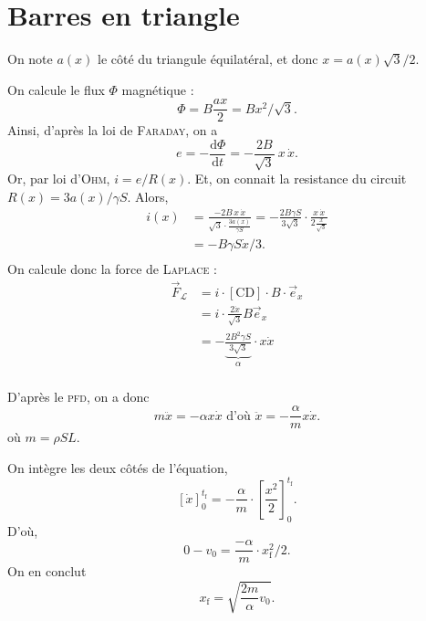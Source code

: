 \section{Barres en triangle}


On note $a(x)$ le côté du triangule équilatéral, et donc $x = a(x) \sqrt{3}  / 2$.

On calcule le flux $\Phi$ magnétique : \[
	\Phi = B \frac{a x}{2} = B x^2 / \sqrt{3}
.\]
Ainsi, d'après la loi de \textsc{Faraday}, on a \[
	e = - \frac{\mathrm{d}\Phi}{\mathrm{d}t} = - \frac{2B}{\sqrt{3}}  \: x\,\dot{x}
.\]
Or, par loi d'\textsc{Ohm}, $i = e / R(x)$.
Et, on connait la resistance du circuit $R(x) = 3 a(x) / \gamma S$.
Alors, 
\begin{align*}
	i(x) &= \frac{-2B\,x\,\dot{x}}{\sqrt{3} \cdot \frac{3a(x)}{\gamma S}} = - \frac{2B \gamma S}{3 \sqrt{3}} \cdot \frac{x\,\dot{x}}{2 \frac{x}{\sqrt{3}}}\\
	&= - B \gamma S \dot{x} / 3. \\
\end{align*}
On calcule donc la force de \textsc{Laplace} :
\begin{align*}
	\vec{F}_{\mathcal{L}} &= i \cdot [\mathrm{CD}] \cdot B \cdot \vec{e}_x\\
	&= i \cdot \frac{2\dot{x}}{\sqrt{3}} B \vec{e}_x \\
	&= -\underbrace{\frac{2 B^2 \gamma S}{3\sqrt{3}}}_\alpha  \cdot x \dot{x} \\
\end{align*}

D'après le \textsc{pfd}, on a donc \[
	m \ddot{x} = - \alpha x \dot{x} \text{ d'où }  \ddot{x} = - \frac{\alpha}{m} x\dot{x} 
.\] où $m = \rho S L$. 

On intègre les deux côtés de l'équation, \[
	[\dot{x}]_0^{t_\mathrm{f}} = -\frac{\alpha}{m} \cdot \left[ \frac{x^2}{2} \right]_0^{t_\mathrm{f}}
.\]
D'où, \[
	0 - v_0 = \frac{-\alpha}{m} \cdot x_\mathrm{f}^2 / 2
.\] On en conclut \[
	x_\mathrm{f} = \sqrt{\frac{2m}{\alpha} v_0} 
.\] 

